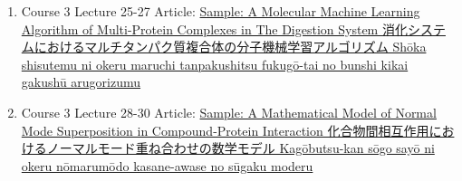 \documentclass[preprint, 8pt]{elsarticle}
\theoremstyle{definition}
\begin{document}
\begin{CJK}{UTF8}{min}
\begin{enumerate}
\item Course 3 Lecture 25-27 Article: \href{}{Sample: A Molecular Machine Learning Algorithm of Multi-Protein Complexes in The Digestion System 消化システムにおけるマルチタンパク質複合体の分子機械学習アルゴリズム Shōka shisutemu ni okeru maruchi tanpakushitsu fukugō-tai no bunshi kikai gakushū arugorizumu}
\item Course 3 Lecture 28-30 Article: \href{}{Sample: A Mathematical Model of Normal Mode Superposition in Compound-Protein Interaction 化合物間相互作用におけるノーマルモード重ね合わせの数学モデル Kagōbutsu-kan sōgo sayō ni okeru nōmarumōdo kasane-awase no sūgaku moderu}
\end{enumerate}

\end{CJK}
\end{document}
